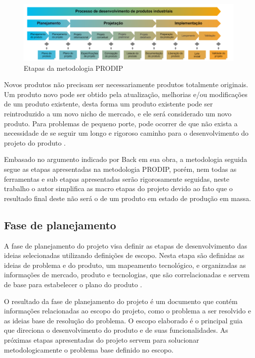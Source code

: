 \begin{figure}[htb]
	\caption{\label{fig:1170}Etapas da metodologia PRODIP}
	\begin{center}
		\includegraphics[width=\textwidth]{pictures/1170.png}
	\end{center}
\end{figure}

Novos produtos não precisam ser necessariamente produtos totalmente originais.
Um produto novo pode ser obtido pela atualização, melhorias e/ou modificações de um produto existente, desta forma um produto existente pode ser reintroduzido a um novo
nicho de mercado, e ele será considerado um novo produto.
Para problemas de pequeno porte, pode ocorrer de que não exista a necessidade de se seguir um longo e rigoroso caminho para o desenvolvimento do projeto do produto \autocite{Back2008}.

Embasado no argumento indicado por Back em sua obra, a metodologia seguida segue as etapas apresentadas na metodologia PRODIP, porém, nem todas as ferramentas e sub etapas
apresentadas serão rigorosamente seguidas, neste trabalho o autor simplifica as macro etapas do projeto devido ao fato que o resultado final deste não será o de um produto
em estado de produção em massa.

\subsection{Fase de planejamento}

A fase de planejamento do projeto visa definir as etapas de desenvolvimento das ideias selecionadas utilizando definições de escopo.
Nesta etapa são definidas as ideias de problema e do produto, um mapeamento tecnológico, e organizadas as informações de mercado, produto e tecnologias, que são correlacionadas
e servem de base para estabelecer o plano do produto \autocite{PRODIP}.

O resultado da fase de planejamento do projeto é um documento que contém informações relacionadas ao escopo do projeto, como o problema a ser resolvido e as ideias base de
resolução do problema.
O escopo elaborado é o principal guia que direciona o desenvolvimento do produto e de suas funcionalidades. As próximas etapas apresentadas do projeto servem para solucionar
metodologicamente o problema base definido no escopo.

